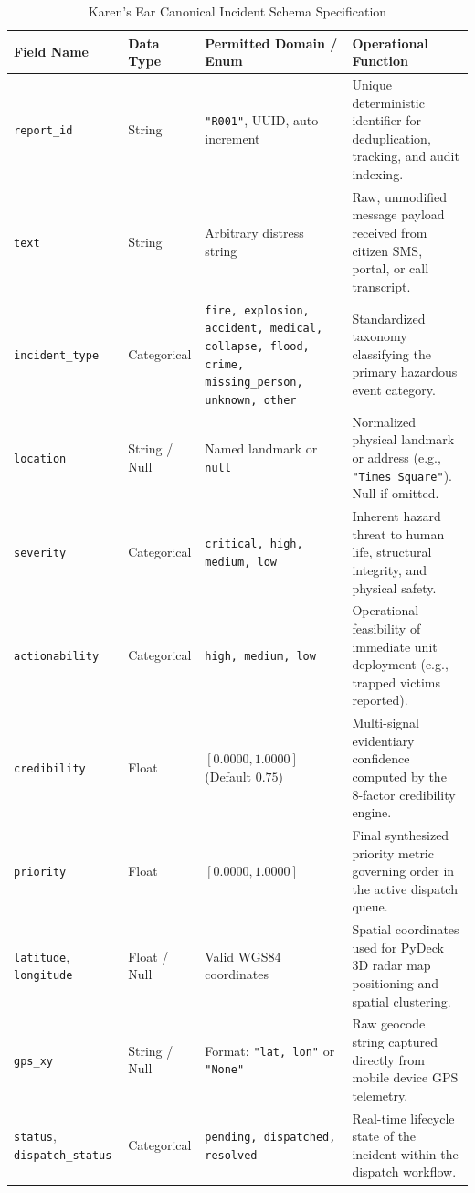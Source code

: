 \documentclass[10pt,a4paper]{article}
\begin{document}
\begin{table}[htbp]
  \centering
  \small
  \caption{Karen's Ear Canonical Incident Schema Specification}
  \label{tab:schema_definition}
  \begin{tabularx}{\textwidth}{lp{2.1cm}p{4.3cm}X}
    \toprule
    \textbf{Field Name} & \textbf{Data Type} & \textbf{Permitted Domain / Enum} & \textbf{Operational Function} \\
    \midrule
    \texttt{report\_id} & String & \texttt{"R001"}, UUID, auto-increment & Unique deterministic identifier for deduplication, tracking, and audit indexing. \\
    \texttt{text} & String & Arbitrary distress string & Raw, unmodified message payload received from citizen SMS, portal, or call transcript. \\
    \texttt{incident\_type} & Categorical & \texttt{fire, explosion, accident, medical, collapse, flood, crime, missing\_person, unknown, other} & Standardized taxonomy classifying the primary hazardous event category. \\
    \texttt{location} & String / Null & Named landmark or \texttt{null} & Normalized physical landmark or address (e.g., \texttt{"Times Square"}). Null if omitted. \\
    \texttt{severity} & Categorical & \texttt{critical, high, medium, low} & Inherent hazard threat to human life, structural integrity, and physical safety. \\
    \texttt{actionability} & Categorical & \texttt{high, medium, low} & Operational feasibility of immediate unit deployment (e.g., trapped victims reported). \\
    \texttt{credibility} & Float & $[0.0000, 1.0000]$ (Default $0.75$) & Multi-signal evidentiary confidence computed by the 8-factor credibility engine. \\
    \texttt{priority} & Float & $[0.0000, 1.0000]$ & Final synthesized priority metric governing order in the active dispatch queue. \\
    \texttt{latitude}, \texttt{longitude} & Float / Null & Valid WGS84 coordinates & Spatial coordinates used for PyDeck 3D radar map positioning and spatial clustering. \\
    \texttt{gps\_xy} & String / Null & Format: \texttt{"lat, lon"} or \texttt{"None"} & Raw geocode string captured directly from mobile device GPS telemetry. \\
    \texttt{status}, \texttt{dispatch\_status} & Categorical & \texttt{pending, dispatched, resolved} & Real-time lifecycle state of the incident within the dispatch workflow. \\

\end{tabularx}
\end{table}
\end{document}
